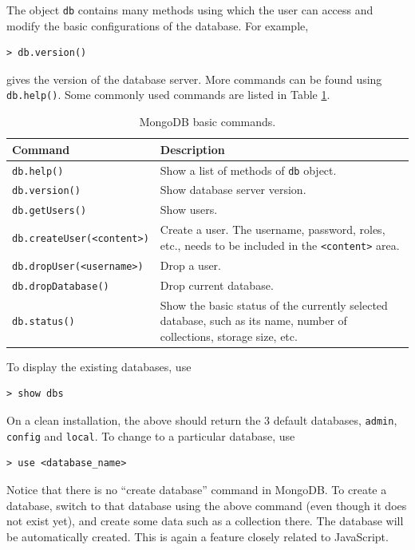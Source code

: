 The object \verb|db| contains many methods using which the user can access and modify the basic configurations of the database. For example,
\begin{lstlisting}
> db.version()
\end{lstlisting}
gives the version of the database server. More commands can be found using \verb|db.help()|. Some commonly used commands are listed in Table \ref{ch:db:tab:mongodbbasics}.
\begin{table}
	\centering \caption{MongoDB basic commands.}\label{ch:db:tab:mongodbbasics}
	\begin{tabularx}{\textwidth}{lX}
		\hline
		Command & Description \\ \hline
        \verb|db.help()| & Show a list of methods of \verb|db| object. \\ \hdashline
		\verb|db.version()| & Show database server version. \\ \hdashline
        \verb|db.getUsers()| & Show users. \\ \hdashline
        \verb|db.createUser(<content>)| & Create a user. The username, password, roles, etc., needs to be included in the \verb|<content>| area. \\ \hdashline
        \verb|db.dropUser(<username>)| & Drop a user. \\ \hdashline
        \verb|db.dropDatabase()| & Drop current database. \\ \hdashline
		\verb|db.status()| & Show the basic status of the currently selected database, such as its name, number of collections, storage size, etc.  \\
		 \hline
	\end{tabularx}
\end{table}

To display the existing databases, use
\begin{lstlisting}
> show dbs
\end{lstlisting}
On a clean installation, the above should return the 3 default databases, \verb|admin|, \verb|config| and \verb|local|. To change to a particular database, use
\begin{lstlisting}
> use <database_name>
\end{lstlisting}
Notice that there is no ``create database'' command in MongoDB. To create a database, switch to that database using the above command (even though it does not exist yet), and create some data such as a collection there. The database will be automatically created. This is again a feature closely related to JavaScript.

